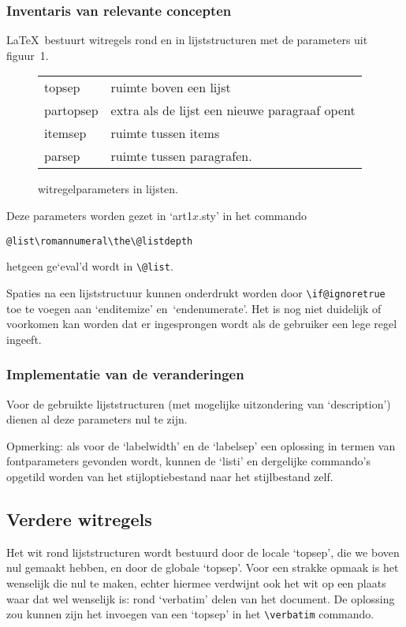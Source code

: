 \documentclass[oldtoc,a4paper,10pt]{rapport3}
\begin{document}
 
\subsubsection{Inventaris van relevante concepten}
\LaTeX\ bestuurt witregels rond en in lijststructuren met de
parameters uit figuur~1.
 
\begin{figure}
  \begin{center}
    \begin{tabular}{ll}
      topsep      &  ruimte boven een lijst\\
      partopsep   &  extra als de lijst een nieuwe paragraaf opent\\
      itemsep     &  ruimte  tussen items\\
      parsep      &  ruimte tussen paragrafen.\\
    \end{tabular}
  \end{center}
  \caption{witregelparameters in lijsten.}
\end{figure}
 
 
\noindent Deze parameters worden gezet in `art1$x$.sty' in het
commando
\begin{verbatim}
@list\romannumeral\the\@listdepth
\end{verbatim}
hetgeen ge`eval'd wordt in \verb.\@list..
 
Spaties na een lijststructuur kunnen onderdrukt worden door
\verb.\if@ignoretrue. toe te voegen aan `enditemize'
en~`endenumerate'. Het is nog niet duidelijk of voorkomen kan worden
dat er ingesprongen wordt als de gebruiker een lege regel ingeeft.
 
 
\subsubsection{Implementatie van de veranderingen}
Voor de gebruikte lijststructuren (met mogelijke uitzondering van
`description') dienen al deze parameters nul te zijn.
 
Opmerking: als voor de `labelwidth' en de `labelsep' een oplossing in
termen van fontparameters gevonden wordt, kunnen de `listi' en
dergelijke commando's opgetild worden van het stijloptiebestand naar
het stijlbestand zelf.
 
 
\subsection{Verdere witregels}
Het wit rond lijststructuren wordt bestuurd door de locale `topsep',
die we boven nul gemaakt hebben, en door de globale `topsep'.  Voor
een strakke opmaak is het wenselijk die nul te maken, echter hiermee
verdwijnt ook het wit op een plaats waar dat wel wenselijk is: rond
`verbatim' delen van het document. De oplossing zou kunnen zijn het
invoegen van een `topsep' in het \verb.\verbatim.  commando.
 
\end{document}
